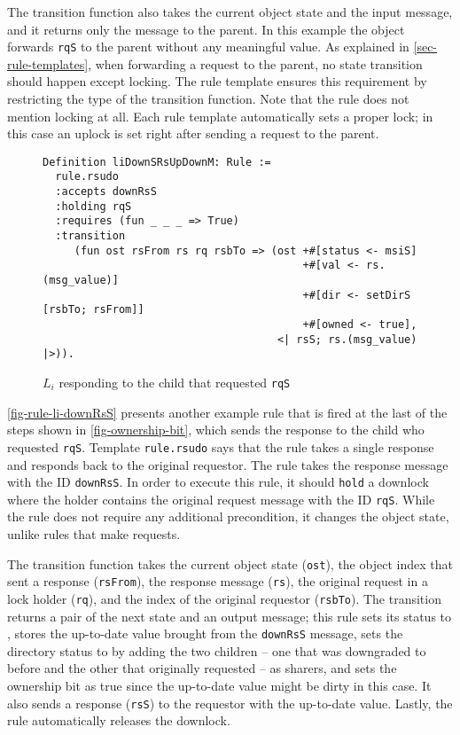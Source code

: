 \documentclass[sigplan,10pt,review,anonymous,screen]{acmart}\settopmatter{printfolios=true,printccs=false,printacmref=false}
\def\slstinline{\lstinline[basicstyle=\ttfamily\small]}
\begin{document}
The transition function also takes the current object state and the input message, and it returns only the message to the parent.
In this example the object forwards \slstinline{rqS} to the parent without any meaningful value.
As explained in \autoref{sec-rule-templates}, when forwarding a request to the parent, no state transition should happen except locking.
The rule template ensures this requirement by restricting the type of the transition function.
Note that the rule does not mention locking at all.
Each rule template automatically sets a proper lock; in this case an uplock is set right after sending a request to the parent.

\begin{figure}[h]
  \centering
\begin{lstlisting}
Definition liDownSRsUpDownM: Rule :=
  rule.rsudo
  :accepts downRsS
  :holding rqS
  :requires (fun _ _ _ => True)
  :transition
     (fun ost rsFrom rs rq rsbTo => (ost +#[status <- msiS]
                                         +#[val <- rs.(msg_value)]
                                         +#[dir <- setDirS [rsbTo; rsFrom]]
                                         +#[owned <- true],
                                     <| rsS; rs.(msg_value) |>)).
\end{lstlisting}
  \caption{$L_i$ responding to the child that requested \slstinline{rqS}}
  \label{fig-rule-li-downRsS}
\end{figure}

\autoref{fig-rule-li-downRsS} presents another example rule that is fired at the last of the steps shown in \autoref{fig-ownership-bit}, which sends the response to the child who requested \slstinline{rqS}.
Template \slstinline{rule.rsudo} says that the rule takes a single response and responds back to the original requestor.
The rule takes the response message with the ID \slstinline{downRsS}.
In order to execute this rule, it should \slstinline{hold} a downlock where the holder contains the original request message with the ID \slstinline{rqS}.
While the rule does not require any additional precondition, it changes the object state, unlike rules that make requests.

The transition function takes the current object state (\slstinline{ost}), the object index that sent a response (\slstinline{rsFrom}), the response message (\slstinline{rs}), the original request in a lock holder (\slstinline{rq}), and the index of the original requestor (\slstinline{rsbTo}).
The transition returns a pair of the next state and an output message; this rule sets its status to \stS{}, stores the up-to-date value brought from the \slstinline{downRsS} message, sets the directory status to \stS{} by adding the two children -- one that was downgraded to \stS{} before and the other that originally requested \stS{} -- as sharers, and sets the ownership bit as true since the up-to-date value might be dirty in this case.
It also sends a response (\slstinline{rsS}) to the requestor with the up-to-date value. Lastly, the rule automatically releases the downlock.
\end{document}
